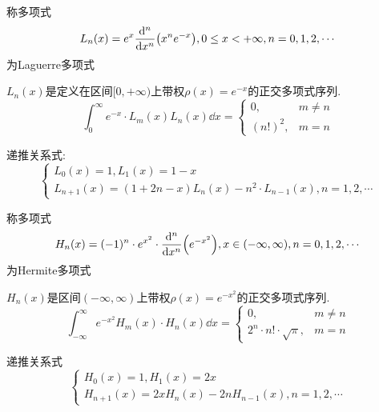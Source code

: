 \begin{definition}[Laguerre多项式]
    称多项式
    \begin{equation*}
        L_n(x)=e^x\dv[n]{x}(x^ne^{-x}), 0\le x<+\infty, n=0,1,2,\cdots
    \end{equation*}
    为Laguerre多项式
\end{definition}

${L_n(x)}$是定义在区间$[0,+\infty)$上带权$\rho(x)=e^{-x}$的正交多项式序列.
\begin{equation*}
    \int_0^\infty e^{-x}\cdot L_m(x)L_n(x)\dd{x}=
    \begin{cases}
        0,&m\ne n\\
        (n!)^2,& m=n
    \end{cases}
\end{equation*}

递推关系式:
\begin{equation*}
    \begin{cases}
        L_0(x)=1, L_1(x)=1-x\\
        L_{n+1}(x)=(1+2n-x)L_n(x)-n^2\cdot L_{n-1}(x), n=1,2,\cdots
    \end{cases}
\end{equation*}

\begin{definition}[Hermite多项式]
    称多项式
    \begin{equation*}
        H_n(x)=(-1)^n\cdot e^{x^2}\cdot\dv[n]{x}(e^{-x^2}), x\in(-\infty, \infty), n=0,1,2,\cdots
    \end{equation*}
    为Hermite多项式
\end{definition}

${H_n(x)}$是区间$(-\infty, \infty)$上带权$\rho(x)=e^{-x^2}$的正交多项式序列.
\begin{equation*}
    \int_{-\infty}^\infty e^{-x^2}H_m(x)\cdot H_n(x)\dd{x}=
    \begin{cases}
        0, &m\ne n\\
        2^n\cdot n!\cdot\sqrt{\pi},& m=n
    \end{cases}
\end{equation*}

递推关系式
\begin{equation*}
    \begin{cases}
        H_0(x)=1, H_1(x)=2x\\
        H_{n+1}(x)=2xH_n(x)-2nH_{n-1}(x), n=1,2,\cdots
    \end{cases}
\end{equation*}

